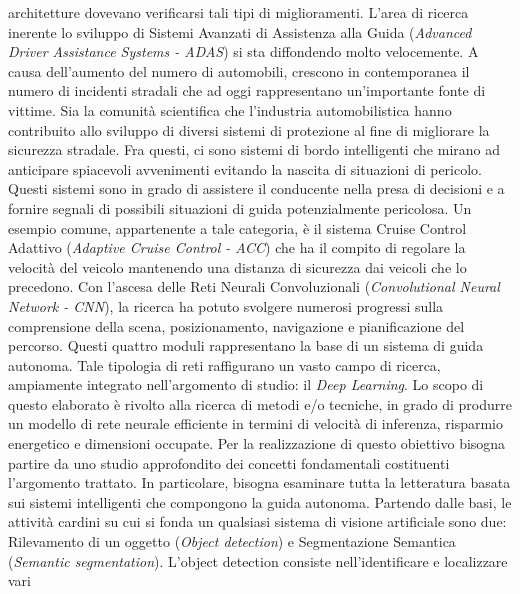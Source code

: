 architetture dovevano verificarsi tali tipi di miglioramenti. L'area di ricerca inerente lo sviluppo di Sistemi Avanzati di Assistenza 
alla Guida (\emph{Advanced Driver Assistance Systems - ADAS}) si sta diffondendo molto velocemente. 
A causa dell'aumento del numero di automobili, crescono in contemporanea 
il numero di incidenti stradali che ad oggi rappresentano un'importante fonte 
di vittime. Sia la comunità scientifica che l'industria automobilistica hanno 
contribuito allo sviluppo di diversi sistemi di protezione al fine di migliorare 
la sicurezza stradale.  Fra questi, ci sono sistemi di bordo intelligenti che 
mirano ad anticipare spiacevoli avvenimenti evitando la nascita di situazioni 
di pericolo. Questi sistemi sono in grado di assistere il conducente nella presa 
di decisioni e a fornire segnali di possibili situazioni di guida potenzialmente 
pericolosa. Un esempio comune, appartenente a tale categoria, è il sistema 
Cruise Control Adattivo (\emph{Adaptive Cruise Control - ACC}) che ha il compito 
di regolare la velocità del veicolo mantenendo una distanza di sicurezza 
dai veicoli che lo precedono. Con l'ascesa delle Reti Neurali Convoluzionali (\emph{Convolutional Neural Network - CNN}), la ricerca ha potuto svolgere numerosi 
progressi sulla comprensione della scena, posizionamento, navigazione e 
pianificazione del percorso. Questi quattro moduli rappresentano la base di 
un sistema di guida autonoma. Tale tipologia di reti raffigurano un vasto 
campo di ricerca, ampiamente integrato nell'argomento di studio: il \emph{Deep 
Learning}. Lo scopo di questo elaborato è rivolto alla ricerca di metodi e/o 
tecniche, in grado di produrre un modello di rete neurale efficiente in termini 
di velocità di inferenza, risparmio energetico e dimensioni occupate. Per la 
realizzazione di questo obiettivo bisogna partire da uno studio approfondito 
dei concetti fondamentali costituenti l'argomento trattato. In particolare, 
bisogna esaminare tutta la letteratura basata sui sistemi intelligenti che 
compongono la guida autonoma. Partendo dalle basi, le attività cardini su 
cui si fonda un qualsiasi sistema di visione artificiale sono due: Rilevamento 
di un oggetto (\emph{Object detection}) e Segmentazione Semantica (\emph{Semantic 
segmentation}). L'object detection consiste nell'identificare e localizzare vari 
